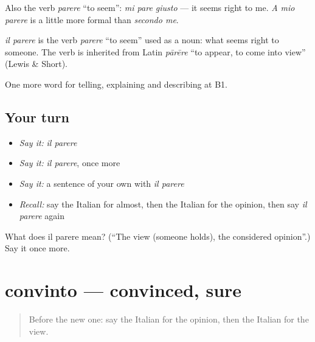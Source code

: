 Also the verb \emph{parere} \textquotedblleft{}to seem\textquotedblright{}: \emph{mi pare giusto} — it seems right to me. \emph{A mio parere} is a little more formal than \emph{secondo me}.

\begin{cousinweb}
\emph{il parere} is the verb \emph{parere} \textquotedblleft{}to seem\textquotedblright{} used as a noun: what seems right to someone. The verb is inherited from Latin \emph{pārēre} \textquotedblleft{}to appear, to come into view\textquotedblright{} (Lewis \& Short).
\end{cousinweb}

\begin{grammarlens}[title={What you've built}]
One more word for telling, explaining and describing at B1.
\end{grammarlens}

\subsection*{Your turn}
\begin{itemize}
\raggedright
  \item \emph{Say it:} \emph{il parere}
  \item \emph{Say it:} \emph{il parere}, once more
  \item \emph{Say it:} a sentence of your own with \emph{il parere}
  \item \emph{Recall:} say the Italian for almost, then the Italian for the opinion, then say \emph{il parere} again
\end{itemize}

\begin{tcolorbox}[breakable,colback=teal!4,colframe=teal!35!black,title={Before you move on}]
What does il parere mean? (\textquotedblleft{}The view (someone holds), the considered opinion\textquotedblright{}.) Say it once more.
\end{tcolorbox}
\section[convinto]{convinto — convinced, sure}

\label{lesson:IT-C339-convinto}



\begin{quote}
Before the new one: say the Italian for the opinion, then the Italian for the view.
\end{quote}

